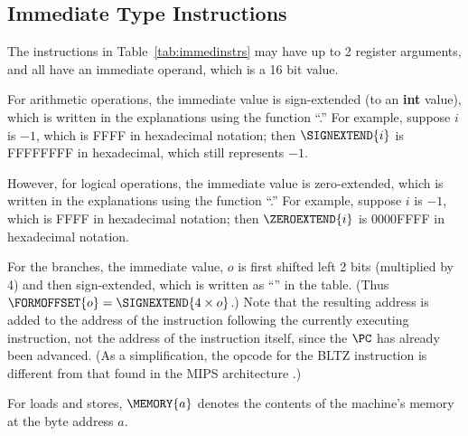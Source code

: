 \documentclass[11pt,letterpaper]{article}
\newcommand{\tabref}[1]{Table~\ref{#1}}  %
\begin{document}
\newpage

\subsection{Immediate Type Instructions}

The instructions in \tabref{tab:immedinstrs} may have up to 2 register
arguments, and all have an immediate operand, which is a 16 bit value.

For arithmetic operations, the immediate value is sign-extended (to an
\textbf{int} value),
which is written in the explanations using the function ``{\SIGNEXTENDNAME}.'' 
For example, suppose $i$ is $-1$, which is FFFF in hexadecimal
notation;
then $\SIGNEXTEND{i}$ is FFFFFFFF in hexadecimal, which still
represents $-1$.

However, for logical operations, the immediate value is zero-extended,
which is written in the explanations using the function ``{\ZEROEXTENDNAME}.''
For example, suppose $i$ is $-1$, which is FFFF in hexadecimal
notation;
then $\ZEROEXTEND{i}$ is 0000FFFF in hexadecimal notation.

For the branches, the immediate value, $o$ is first shifted left 2
bits (multiplied by 4) and then sign-extended, which is written as
``{\FORMOFFSETNAME}'' in the table.
(Thus $\FORMOFFSET{o} = \SIGNEXTEND{4 \times o}$.)
Note that the resulting address is added to the address of the
instruction following the currently executing instruction, not the
address of the instruction itself, since the $\PC$ has already been advanced.
(As a simplification, the opcode for the BLTZ instruction is different
from that found in the MIPS architecture \cite{Kane-Heinrich92}.)

For loads and stores, $\MEMORY{a}$ denotes the contents of the
machine's memory at the byte address $a$.
\end{document}
